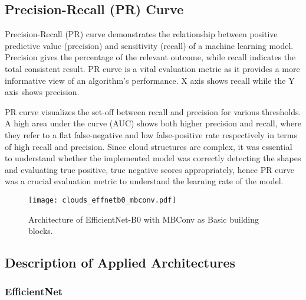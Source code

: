 \documentclass[conference]{IEEEtran}
\begin{document}
\subsection{Precision-Recall (PR) Curve}

Precision-Recall (PR) curve demonstrates the relationship between positive predictive value (precision) and sensitivity (recall) of a machine learning model. Precision gives the percentage of the relevant outcome, while recall indicates the total consistent result. PR curve is a vital evaluation metric as it provides a more informative view of an algorithm's performance. X axis shows recall while the Y axis shows precision.

PR curve visualizes the set-off between recall and precision for various thresholds. A high area under the curve (AUC) shows both higher precision and recall, where they refer to a flat false-negative and low false-positive rate respectively in terms of high recall and precision. Since cloud structures are complex, it was essential to understand whether the implemented model was correctly detecting the shapes and evaluating true positive, true negative scores appropriately, hence PR curve was a crucial evaluation metric to understand the learning rate of the model.

\begin{figure}
    \centering
    \texttt{[image: clouds\_effnetb0\_mbconv.pdf]}
    \caption{Architecture of EfficientNet-B0 with MBConv as Basic building blocks.}
    \label{mbconv}
\end{figure}




\subsection{Description of Applied Architectures}
\subsubsection{EfficientNet}
\end{document}
